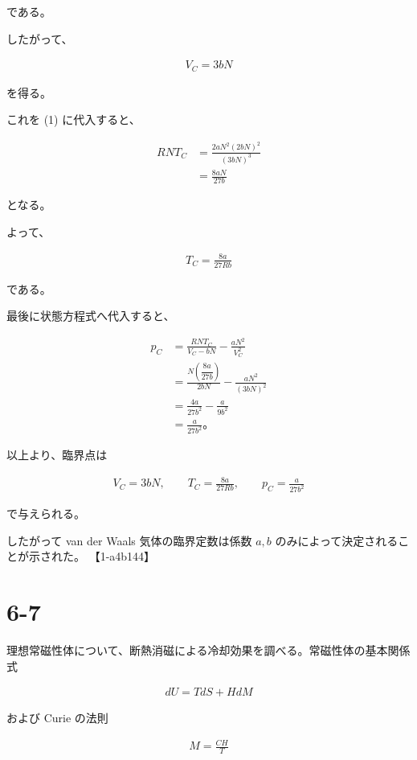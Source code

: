 \documentclass[platex,dvipdfmx,a4paper]{jsarticle}
\begin{document}
である。

したがって、

\begin{align*}
V_C
=
3bN
\end{align*}

を得る。

これを (1) に代入すると、

\begin{align*}
RNT_C
&=
\frac{
2aN^2(2bN)^2
}{
(3bN)^3
}
\\
&=
\frac{8aN}{27b}
\end{align*}

となる。

よって、

\begin{align*}
T_C
=
\frac{8a}{27Rb}
\end{align*}

である。

最後に状態方程式へ代入すると、

\begin{align*}
p_C
&=
\frac{RNT_C}{V_C-bN}
-\frac{aN^2}{V_C^2}
\\
&=
\frac{
N
\left(
\dfrac{8a}{27b}
\right)
}{
2bN
}
-
\frac{aN^2}
{(3bN)^2}
\\
&=
\frac{4a}{27b^2}
-\frac{a}{9b^2}
\\
&=
\frac{a}{27b^2}。
\end{align*}

以上より、臨界点は

\begin{align*}
V_C
=
3bN,
\qquad
T_C
=
\frac{8a}{27Rb},
\qquad
p_C
=
\frac{a}{27b^2}
\end{align*}

で与えられる。

したがって van der Waals 気体の臨界定数は係数 $a,b$ のみによって決定されることが示された。 【1-a4b144】
\section{6-7}

理想常磁性体について、断熱消磁による冷却効果を調べる。常磁性体の基本関係式

\begin{align*}
dU
=
TdS+HdM
\end{align*}

および Curie の法則

\begin{align*}
M=\frac{CH}{T}
\end{align*}
\end{document}
